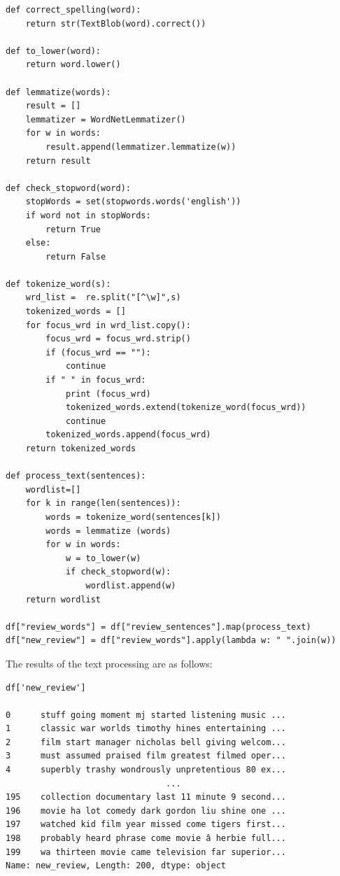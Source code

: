 \documentclass[12pt, letterpaper]{article}
\begin{document}
\begin{mdframed}[backgroundcolor=shadecolor]
\begin{verbatim}
def correct_spelling(word):
    return str(TextBlob(word).correct())

def to_lower(word):
    return word.lower()

def lemmatize(words):
    result = []
    lemmatizer = WordNetLemmatizer()
    for w in words:
        result.append(lemmatizer.lemmatize(w))
    return result

def check_stopword(word):
    stopWords = set(stopwords.words('english'))   
    if word not in stopWords:
        return True
    else:
        return False

def tokenize_word(s):
    wrd_list =  re.split("[^\w]",s)
    tokenized_words = []
    for focus_wrd in wrd_list.copy():
        focus_wrd = focus_wrd.strip()
        if (focus_wrd == ""):
            continue
        if " " in focus_wrd:
            print (focus_wrd)
            tokenized_words.extend(tokenize_word(focus_wrd))
            continue
        tokenized_words.append(focus_wrd)
    return tokenized_words

def process_text(sentences):
    wordlist=[]
    for k in range(len(sentences)):
        words = tokenize_word(sentences[k])    
        words = lemmatize (words) 
        for w in words:            
            w = to_lower(w)            
            if check_stopword(w):
                wordlist.append(w)
    return wordlist

df["review_words"] = df["review_sentences"].map(process_text)
df["new_review"] = df["review_words"].apply(lambda w: " ".join(w))

\end{verbatim}
\end{mdframed}

The results of the text processing are as follows:

\begin{verbatim}
df['new_review']

0      stuff going moment mj started listening music ...
1      classic war worlds timothy hines entertaining ...
2      film start manager nicholas bell giving welcom...
3      must assumed praised film greatest filmed oper...
4      superbly trashy wondrously unpretentious 80 ex...
                                ...                        
195    collection documentary last 11 minute 9 second...
196    movie ha lot comedy dark gordon liu shine one ...
197    watched kid film year missed come tigers first...
198    probably heard phrase come movie â herbie full...
199    wa thirteen movie came television far superior...
Name: new_review, Length: 200, dtype: object
\end{verbatim}
\end{document}
